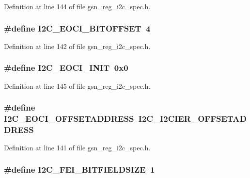 Definition at line 144 of file gsn\_\-reg\_\-i2c\_\-spec.h.

\hypertarget{a00558_a330c6a378967322aed43829dc329f35a}{
\subsubsection[{I2C\_\-EOCI\_\-BITOFFSET}]{\setlength{\rightskip}{0pt plus 5cm}\#define I2C\_\-EOCI\_\-BITOFFSET~4}}
\label{a00558_a330c6a378967322aed43829dc329f35a}


Definition at line 142 of file gsn\_\-reg\_\-i2c\_\-spec.h.

\hypertarget{a00558_a797028ebef32b67f958100f5e99a3d23}{
\subsubsection[{I2C\_\-EOCI\_\-INIT}]{\setlength{\rightskip}{0pt plus 5cm}\#define I2C\_\-EOCI\_\-INIT~0x0}}
\label{a00558_a797028ebef32b67f958100f5e99a3d23}


Definition at line 145 of file gsn\_\-reg\_\-i2c\_\-spec.h.

\hypertarget{a00558_a11311c70f2bc69a3df2dd2cee9990fc7}{
\subsubsection[{I2C\_\-EOCI\_\-OFFSETADDRESS}]{\setlength{\rightskip}{0pt plus 5cm}\#define I2C\_\-EOCI\_\-OFFSETADDRESS~I2C\_\-I2CIER\_\-OFFSETADDRESS}}
\label{a00558_a11311c70f2bc69a3df2dd2cee9990fc7}


Definition at line 141 of file gsn\_\-reg\_\-i2c\_\-spec.h.

\hypertarget{a00558_a08430c3a9c0e3acf882b942bd2dc0a44}{
\subsubsection[{I2C\_\-FEI\_\-BITFIELDSIZE}]{\setlength{\rightskip}{0pt plus 5cm}\#define I2C\_\-FEI\_\-BITFIELDSIZE~1}}
\label{a00558_a08430c3a9c0e3acf882b942bd2dc0a44}


